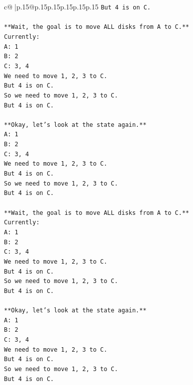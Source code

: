 \documentclass{article}
\begin{document}
{\begin{supertabular}{c@{$\;$}|p{.15\linewidth}@{}p{.15\linewidth}p{.15\linewidth}p{.15\linewidth}p{.15\linewidth}p{.15\linewidth}}
{{{\texttt{But 4 is on C.} \\
\\ 
\texttt{**Wait, the goal is to move ALL disks from A to C.**} \\
\texttt{Currently:} \\
\texttt{A: 1} \\
\texttt{B: 2} \\
\texttt{C: 3, 4} \\
\texttt{We need to move 1, 2, 3 to C.} \\
\texttt{But 4 is on C.} \\
\texttt{So we need to move 1, 2, 3 to C.} \\
\texttt{But 4 is on C.} \\
\\ 
\texttt{**Okay, let's look at the state again.**} \\
\texttt{A: 1} \\
\texttt{B: 2} \\
\texttt{C: 3, 4} \\
\texttt{We need to move 1, 2, 3 to C.} \\
\texttt{But 4 is on C.} \\
\texttt{So we need to move 1, 2, 3 to C.} \\
\texttt{But 4 is on C.} \\
\\ 
\texttt{**Wait, the goal is to move ALL disks from A to C.**} \\
\texttt{Currently:} \\
\texttt{A: 1} \\
\texttt{B: 2} \\
\texttt{C: 3, 4} \\
\texttt{We need to move 1, 2, 3 to C.} \\
\texttt{But 4 is on C.} \\
\texttt{So we need to move 1, 2, 3 to C.} \\
\texttt{But 4 is on C.} \\
\\ 
\texttt{**Okay, let's look at the state again.**} \\
\texttt{A: 1} \\
\texttt{B: 2} \\
\texttt{C: 3, 4} \\
\texttt{We need to move 1, 2, 3 to C.} \\
\texttt{But 4 is on C.} \\
\texttt{So we need to move 1, 2, 3 to C.} \\
\texttt{But 4 is on C.} \\
}}}
\end{supertabular}}
\end{document}
